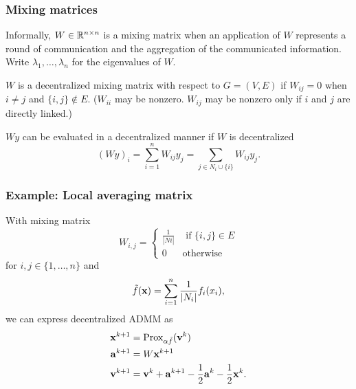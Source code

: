 \documentclass[10pt,mathserif]{beamer}
\begin{document}
\begin{frame}
\frametitle{Mixing matrices}
Informally, $W\in \mathbb{R}^{n\times n}$ is a mixing matrix when an application of $W$ represents a round of communication and the aggregation of the communicated information.
Write $\lambda_1,\dots,\lambda_n$ for the eigenvalues of $W$.

\vspace{0.2in}

$W$ is a decentralized mixing matrix with respect to $G=(V,E)$ if $W_{ij} = 0$ when $i\ne j$ and $\{i,j\}\notin E$. ($W_{ii}$ may be nonzero. $W_{ij}$ may be nonzero only if $i$ and $j$ are directly linked.)
\vspace{0.2in}

$Wy$ can be evaluated in a decentralized manner if $W$ is decentralized
\[
(Wy)_{i}=\sum^n_{i=1}W_{ij}y_j=\sum_{j\in N_i\cup\{i\}}W_{ij}y_j.
\]
\end{frame}





\begin{frame}
\frametitle{Example: Local averaging matrix}
With mixing matrix
\[
W_{i,j}=
\left\{
\begin{array}{ll}
\frac{1}{|Ni|}&\text{ if }\{i,j\}\in E\\
0&\text{otherwise}
\end{array}
\right.
\]
for $i,j\in \{1,\dots,n\}$ and
\[
\tilde{f}({\mathbf{x}})=\sum^n_{i=1}\frac{1}{|N_i|}f_i(x_i),
\]
we can express decentralized ADMM as
\begin{align*}
     {\mathbf{x}}^{k+1} &= \mathrm{Prox}_{\alpha \tilde{f}}({\mathbf{v}}^k)\\
     {\mathbf{a}}^{k+1} &= W{\mathbf{x}}^{k+1}\\
     {\mathbf{v}}^{k+1} &= {\mathbf{v}}^k + {\mathbf{a}}^{k+1}-\frac{1}{2}{\mathbf{a}}^k - \frac{1}{2}{\mathbf{x}}^k.
\end{align*}
\end{frame}
\end{document}
